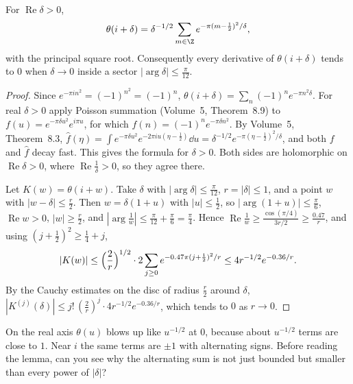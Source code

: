 \begin{lemma}\label{lem:thetai}
For $\operatorname{Re}\delta>0$,
\[
\theta(i+\delta)=\delta^{-1/2}\sum_{m\in\Z}e^{-\pi(m-\frac12)^2/\delta},
\]
with the principal square root. Consequently every derivative of $\theta(i+\delta)$ tends to $0$ when $\delta\to0$ inside a sector $|\arg\delta|\le\frac\pi{12}$.
\end{lemma}
\begin{proof}
Since $e^{-\pi in^2}=(-1)^{n^2}=(-1)^n$, $\theta(i+\delta)=\sum_n(-1)^ne^{-\pi n^2\delta}$. For real $\delta>0$ apply Poisson summation (Volume~5, Theorem~8.9) to $f(u)=e^{-\pi\delta u^2}e^{i\pi u}$, for which $f(n)=(-1)^ne^{-\pi\delta n^2}$. By Volume~5, Theorem~8.3,
$\hat f(\eta)=\int e^{-\pi\delta u^2}e^{-2\pi iu(\eta-\frac12)}\dd u=\delta^{-1/2}e^{-\pi(\eta-\frac12)^2/\delta}$, and both $f$ and $\hat f$ decay fast. This gives the formula for $\delta>0$. Both sides are holomorphic on $\operatorname{Re}\delta>0$, where $\operatorname{Re}\frac1\delta>0$, so they agree there.

Let $K(w)=\theta(i+w)$. Take $\delta$ with $|\arg\delta|\le\frac\pi{12}$, $r=|\delta|\le1$, and a point $w$ with $|w-\delta|\le\frac r2$. Then $w=\delta(1+u)$ with $|u|\le\frac12$, so $|\arg(1+u)|\le\frac\pi6$, $\operatorname{Re}w>0$, $|w|\ge\frac r2$, and $|\arg\frac1w|\le\frac\pi{12}+\frac\pi6=\frac\pi4$. Hence $\operatorname{Re}\frac1w\ge\frac{\cos(\pi/4)}{3r/2}\ge\frac{0.47}r$, and using $(j+\frac12)^2\ge\frac14+j$,
\[
|K(w)|\le\Bigl(\frac2r\Bigr)^{1/2}\cdot2\sum_{j\ge0}e^{-0.47\pi(j+\frac12)^2/r}\le4r^{-1/2}e^{-0.36/r}.
\]
By the Cauchy estimates on the disc of radius $\frac r2$ around $\delta$, $|K^{(j)}(\delta)|\le j!\,(\frac2r)^j\cdot4r^{-1/2}e^{-0.36/r}$, which tends to $0$ as $r\to0$.
\end{proof}

\begin{think}
On the real axis $\theta(u)$ blows up like $u^{-1/2}$ at $0$, because about $u^{-1/2}$ terms are close to $1$. Near $i$ the same terms are $\pm1$ with alternating signs. Before reading the lemma, can you see why the alternating sum is not just bounded but smaller than every power of $|\delta|$?
\end{think}

